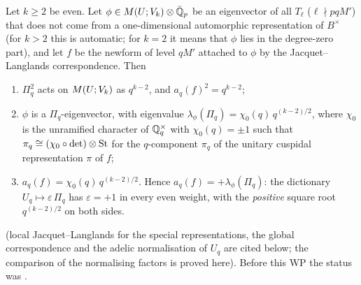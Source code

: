 \begin{proposition}\label{prop:s05-signe}
Let $k\ge2$ be even. Let $\phi\in M(U;V_k)\otimes\bar{\mathbb{Q}}_p$ be an eigenvector of all $T_\ell$ ($\ell\nmid pqM'$) that does not
come from a one-dimensional automorphic representation of $B^\times$ (for $k>2$ this is automatic; for $k=2$ it means that
$\phi$ lies in the degree-zero part), and let $f$ be the newform of level $qM'$ attached to $\phi$ by the Jacquet--Langlands
correspondence. Then
\begin{enumerate}[label=(\roman*)]
\item $\Pi_q^2$ acts on $M(U;V_k)$ as $q^{k-2}$, and $a_q(f)^2=q^{k-2}$;
\item $\phi$ is a $\Pi_q$-eigenvector, with eigenvalue $\lambda_\phi(\Pi_q)=\chi_0(q)\,q^{(k-2)/2}$, where $\chi_0$ is the unramified
  character of $\mathbb{Q}_q^\times$ with $\chi_0(q)=\pm1$ such that $\pi_q\cong(\chi_0\circ\det)\otimes\mathrm{St}$ for the $q$-component $\pi_q$
  of the unitary cuspidal representation $\pi$ of $f$;
\item $a_q(f)=\chi_0(q)\,q^{(k-2)/2}$. Hence $a_q(f)=+\lambda_\phi(\Pi_q)$: the dictionary $U_q\mapsto\varepsilon\,\Pi_q$ has
  $\varepsilon=+1$ in every even weight, with the \emph{positive} square root $q^{(k-2)/2}$ on both sides.
\end{enumerate}
\stpmc{} (local Jacquet--Langlands for the special representations, the global correspondence and the adelic normalisation of
$U_q$ are cited below; the comparison of the normalising factors is proved here). Before this WP the status was \stexp.
\end{proposition}

